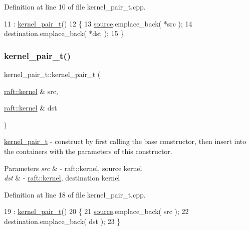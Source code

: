 Definition at line 10 of file kernel\+\_\+pair\+\_\+t.\+cpp.


\begin{DoxyCode}
11                                                        : \hyperlink{classkernel__pair__t_a7b3e46fff3f852a76b0af10002eb07f8}{kernel\_pair\_t}()
12 \{
13     \hyperlink{classsource}{source}.emplace\_back( *src );
14     destination.emplace\_back( *dst );
15 \}
\end{DoxyCode}
\hypertarget{classkernel__pair__t_a1d877d839c148a1adf0d74c2674d6b6d}{}\label{classkernel__pair__t_a1d877d839c148a1adf0d74c2674d6b6d} 
\subsubsection{\texorpdfstring{kernel\+\_\+pair\+\_\+t()}{kernel\_pair\_t()}\hspace{0.1cm}{\footnotesize\ttfamily [3/3]}}
{\footnotesize\ttfamily kernel\+\_\+pair\+\_\+t\+::kernel\+\_\+pair\+\_\+t (\begin{DoxyParamCaption}\item[{\hyperlink{classraft_1_1kernel}{raft\+::kernel} \&}]{src,  }\item[{\hyperlink{classraft_1_1kernel}{raft\+::kernel} \&}]{dst }\end{DoxyParamCaption})}

\hyperlink{classkernel__pair__t}{kernel\+\_\+pair\+\_\+t} -\/ construct by first calling the base constructor, then insert into the containers with the parameters of this constructor. 
\begin{DoxyParams}{Parameters}
{\em src} & -\/ raft;\+:kernel, source kernel \\
\hline
{\em dst} & -\/ \hyperlink{classraft_1_1kernel}{raft\+::kernel}, destination kernel \\
\hline
\end{DoxyParams}


Definition at line 18 of file kernel\+\_\+pair\+\_\+t.\+cpp.


\begin{DoxyCode}
19                                                 : \hyperlink{classkernel__pair__t_a7b3e46fff3f852a76b0af10002eb07f8}{kernel\_pair\_t}()
20 \{
21     \hyperlink{classsource}{source}.emplace\_back( src );
22     destination.emplace\_back( dst );
23 \}
\end{DoxyCode}


